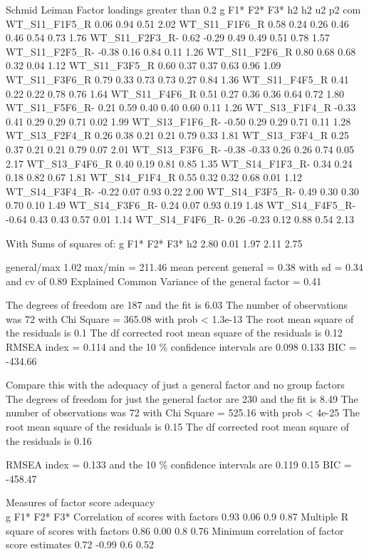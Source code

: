 \documentclass[
]{article}
\begin{document}
Schmid Leiman Factor loadings greater than 0.2 g F1* F2* F3* h2 h2 u2 p2
com WT\_S11\_F1F5\_R 0.06 0.94 0.51 2.02 WT\_S11\_F1F6\_R 0.58 0.24 0.26
0.46 0.46 0.54 0.73 1.76 WT\_S11\_F2F3\_R- 0.62 -0.29 0.49 0.49 0.51
0.78 1.57 WT\_S11\_F2F5\_R- -0.38 0.16 0.84 0.11 1.26 WT\_S11\_F2F6\_R
0.80 0.68 0.68 0.32 0.04 1.12 WT\_S11\_F3F5\_R 0.60 0.37 0.37 0.63 0.96
1.09 WT\_S11\_F3F6\_R 0.79 0.33 0.73 0.73 0.27 0.84 1.36
WT\_S11\_F4F5\_R 0.41 0.22 0.22 0.78 0.76 1.64 WT\_S11\_F4F6\_R 0.51
0.27 0.36 0.36 0.64 0.72 1.80 WT\_S11\_F5F6\_R- 0.21 0.59 0.40 0.40 0.60
0.11 1.26 WT\_S13\_F1F4\_R -0.33 0.41 0.29 0.29 0.71 0.02 1.99
WT\_S13\_F1F6\_R- -0.50 0.29 0.29 0.71 0.11 1.28 WT\_S13\_F2F4\_R 0.26
0.38 0.21 0.21 0.79 0.33 1.81 WT\_S13\_F3F4\_R 0.25 0.37 0.21 0.21 0.79
0.07 2.01 WT\_S13\_F3F6\_R- -0.38 -0.33 0.26 0.26 0.74 0.05 2.17
WT\_S13\_F4F6\_R 0.40 0.19 0.81 0.85 1.35 WT\_S14\_F1F3\_R- 0.34 0.24
0.18 0.82 0.67 1.81 WT\_S14\_F1F4\_R 0.55 0.32 0.32 0.68 0.01 1.12
WT\_S14\_F3F4\_R- -0.22 0.07 0.93 0.22 2.00 WT\_S14\_F3F5\_R- 0.49 0.30
0.30 0.70 0.10 1.49 WT\_S14\_F3F6\_R- 0.24 0.07 0.93 0.19 1.48
WT\_S14\_F4F5\_R- -0.64 0.43 0.43 0.57 0.01 1.14 WT\_S14\_F4F6\_R- 0.26
-0.23 0.12 0.88 0.54 2.13

With Sums of squares of: g F1* F2* F3* h2 2.80 0.01 1.97 2.11 2.75

general/max 1.02 max/min = 211.46 mean percent general = 0.38 with sd =
0.34 and cv of 0.89 Explained Common Variance of the general factor =
0.41

The degrees of freedom are 187 and the fit is 6.03 The number of
observations was 72 with Chi Square = 365.08 with prob \textless{}
1.3e-13 The root mean square of the residuals is 0.1 The df corrected
root mean square of the residuals is 0.12 RMSEA index = 0.114 and the 10
\% confidence intervals are 0.098 0.133 BIC = -434.66

Compare this with the adequacy of just a general factor and no group
factors The degrees of freedom for just the general factor are 230 and
the fit is 8.49 The number of observations was 72 with Chi Square =
525.16 with prob \textless{} 4e-25 The root mean square of the residuals
is 0.15 The df corrected root mean square of the residuals is 0.16

RMSEA index = 0.133 and the 10 \% confidence intervals are 0.119 0.15
BIC = -458.47

Measures of factor score adequacy\\
g F1* F2* F3* Correlation of scores with factors 0.93 0.06 0.9 0.87
Multiple R square of scores with factors 0.86 0.00 0.8 0.76 Minimum
correlation of factor score estimates 0.72 -0.99 0.6 0.52
\end{document}
